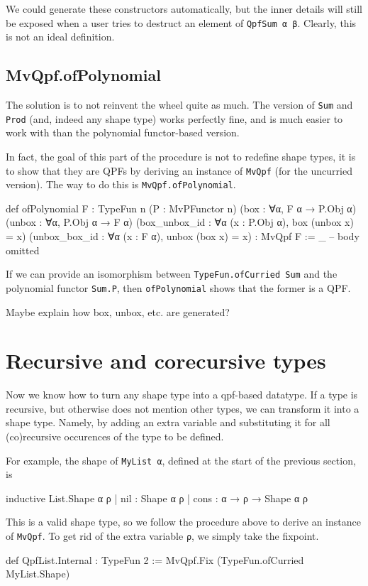 \documentclass[titlepage]{report}
\newenvironment{todo}[1][Todo:]{\begin{trivlist}                         
    \item[\hskip \labelsep {\bfseries #1}]}{\end{trivlist}}
\begin{document}
We could generate these constructors automatically, but the inner details will still be exposed
when a user tries to destruct an element of \texttt{QpfSum α β}.
Clearly, this is not an ideal definition.

\subsection{MvQpf.ofPolynomial}
The solution is to not reinvent the wheel quite as much.
The  version of \texttt{Sum} and \texttt{Prod} (and, indeed any shape type) works
perfectly fine, and is much easier to work with than the polynomial functor-based version.

In fact, the goal of this part of the procedure is not to redefine shape types, it is to show that
they are QPFs by deriving an instance of \texttt{MvQpf} (for the uncurried version).
The way to do this is \texttt{MvQpf.ofPolynomial}.

\begin{leancode}
    def ofPolynomial {F : TypeFun n} 
                     (P : MvPFunctor n) 
                     (box    : ∀{α}, F α → P.Obj α) 
                     (unbox  : ∀{α}, P.Obj α → F α) 
                     (box_unbox_id : ∀{α} (x : P.Obj α), box (unbox x) = x)
                     (unbox_box_id : ∀{α} (x : F α), unbox (box x) = x)
                  : MvQpf F
        := _ -- body omitted
\end{leancode}

If we can provide an isomorphism between \texttt{TypeFun.ofCurried Sum} and the polynomial functor \texttt{Sum.P}, 
then \texttt{ofPolynomial} shows that the former is a QPF.

\begin{todo}
    Maybe explain how box, unbox, etc. are generated?
\end{todo}






\section{Recursive and corecursive types}
Now we know how to turn any shape type into a qpf-based datatype.
If a type is recursive, but otherwise does not mention other types, we can transform it into a shape
type.
Namely, by adding an extra variable and substituting it for all (co)recursive occurences of the type
to be defined.

For example, the shape of \texttt{MyList α}, defined at the start of the previous section, is
\begin{leancode}
    inductive List.Shape α ρ
      | nil  : Shape α ρ
      | cons : α → ρ → Shape α ρ
\end{leancode}
This is a valid shape type, so we follow the procedure above to derive an instance of \texttt{MvQpf}.
To get rid of the extra variable \texttt{ρ}, we simply take the fixpoint.
\begin{leancode}
    def QpfList.Internal : TypeFun 2 
        := MvQpf.Fix (TypeFun.ofCurried MyList.Shape)

\end{leancode}
\end{document}
